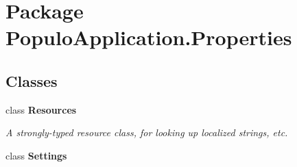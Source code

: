 \hypertarget{namespace_populo_application_1_1_properties}{\section{Package Populo\+Application.\+Properties}
\label{namespace_populo_application_1_1_properties}
}
\subsection*{Classes}
\begin{DoxyCompactItemize}
\item 
class {\bfseries Resources}
\begin{DoxyCompactList}\small\item\em A strongly-\/typed resource class, for looking up localized strings, etc. \end{DoxyCompactList}\item 
class {\bfseries Settings}
\end{DoxyCompactItemize}
